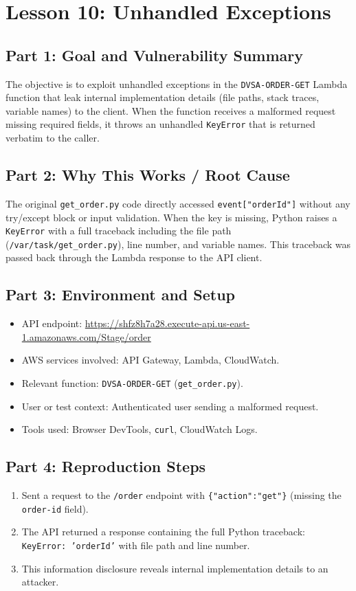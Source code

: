 \documentclass[12pt]{report}
\begin{document}
\chapter{Lesson 10: Unhandled Exceptions}

\section{Part 1: Goal and Vulnerability Summary}
The objective is to exploit unhandled exceptions in the \texttt{DVSA-ORDER-GET} Lambda function that leak internal implementation details (file paths, stack traces, variable names) to the client. When the function receives a malformed request missing required fields, it throws an unhandled \texttt{KeyError} that is returned verbatim to the caller.

\section{Part 2: Why This Works / Root Cause}
The original \texttt{get\_order.py} code directly accessed \texttt{event["orderId"]} without any try/except block or input validation. When the key is missing, Python raises a \texttt{KeyError} with a full traceback including the file path (\texttt{/var/task/get\_order.py}), line number, and variable names. This traceback was passed back through the Lambda response to the API client.

\section{Part 3: Environment and Setup}
\begin{itemize}
  \item API endpoint: \url{https://shfz8h7a28.execute-api.us-east-1.amazonaws.com/Stage/order}
  \item AWS services involved: API Gateway, Lambda, CloudWatch.
  \item Relevant function: \texttt{DVSA-ORDER-GET} (\texttt{get\_order.py}).
  \item User or test context: Authenticated user sending a malformed request.
  \item Tools used: Browser DevTools, \texttt{curl}, CloudWatch Logs.
\end{itemize}

\section{Part 4: Reproduction Steps}
\begin{enumerate}
  \item Sent a request to the \texttt{/order} endpoint with \texttt{\{"action":"get"\}} (missing the \texttt{order-id} field).
  \item The API returned a response containing the full Python traceback: \texttt{KeyError: 'orderId'} with file path and line number.
  \item This information disclosure reveals internal implementation details to an attacker.
\end{enumerate}
\end{document}
